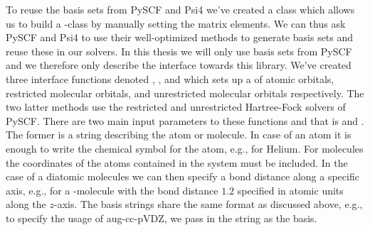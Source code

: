         To reuse the basis sets from PySCF \cite{pyscf} and Psi4 \cite{psi4}
        we've created a class  which allows us to build a
        -class by manually setting the matrix elements.
        We can thus ask PySCF and Psi4 to use their well-optimized methods to
        generate basis sets and reuse these in our solvers.
        In this thesis we will only use basis sets from PySCF and we therefore
        only describe the interface towards this library.
        We've created three interface functions denoted
        , , and
         which sets up a  of
        atomic orbitals, restricted molecular orbitals, and unrestricted
        molecular orbitals respectively.
        The two latter methods use the restricted and unrestricted Hartree-Fock
        solvers of PySCF.
        There are two main input parameters to these functions and that is
         and .
        The former is a string describing the atom or molecule.
        In case of an atom it is enough to write the chemical symbol for the
        atom, e.g.,  for Helium.
        For molecules the coordinates of the atoms contained in the system must
        be included.
        In the case of a diatomic molecules we can then specify a bond distance
        along a specific axis, e.g.,  for a
        -molecule with the bond distance $1.2$ specified in atomic units
        along the $z$-axis.
        The basis strings share the same format as discussed above, e.g., to
        specify the usage of aug-cc-pVDZ, we pass in the string
         as the basis.


